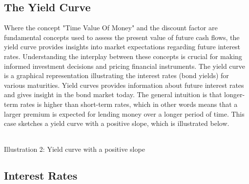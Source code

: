 \subsection{The Yield Curve}
Where the concept "Time Value Of Money" and the discount factor are fundamental concepts used to assess the present value of future
cash flows, the yield curve provides insights into market expectations regarding future interest rates.
Understanding the interplay between these concepts is crucial for making informed investment decisions and pricing
financial instruments. The yield curve is a graphical representation illustrating the interest rates (bond yields) for various maturities.
Yield curves provides information about future interest rates and gives insight in the bond market today. 
The general intuition is that longer-term rates is higher than short-term rates, which in other words means that a
larger premium is expected for lending money over a longer period of time. This case sketches a yield curve with a 
positive slope, which is illustrated below.
\begin{center}
    \\[10pt] 
    Illustration 2: Yield curve with a positive slope
\end{center}
\subsection{Interest Rates}
